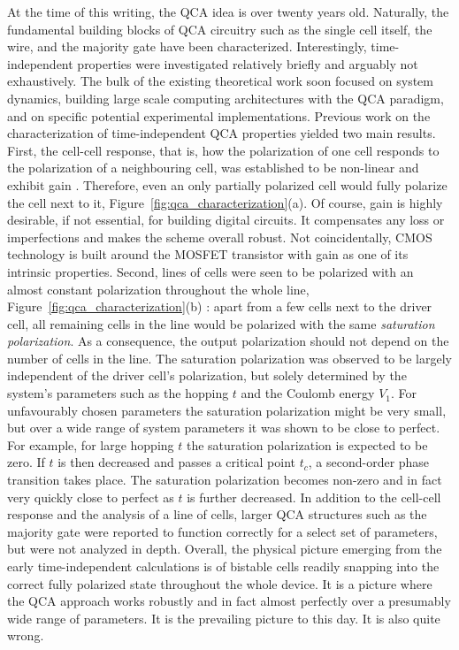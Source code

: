 At the time of this writing, the QCA idea is over twenty years old. Naturally,
the fundamental building blocks of QCA circuitry such as the single cell itself,
the wire, and the majority gate have been characterized. Interestingly,
time-independent properties were investigated relatively briefly and arguably
not exhaustively. The bulk of the existing theoretical work soon focused on
system dynamics, building large scale computing architectures with the QCA
paradigm, and on specific potential experimental implementations. Previous work
on the characterization of time-independent QCA properties yielded two main
results. First, the cell-cell response, that is, how the polarization of one
cell responds to the polarization of a neighbouring cell, was established to be
non-linear and exhibit gain \cite{lent1993quantum}. Therefore, even an only
partially polarized cell would fully polarize the cell next to it,
Figure~\ref{fig:qca_characterization}(a). Of course, gain is highly desirable,
if not essential, for building digital circuits. It compensates any loss or
imperfections and makes the scheme overall robust. Not coincidentally, CMOS
technology is built around the MOSFET transistor with gain as one of its
intrinsic properties. Second, lines of cells were seen to be polarized with an
almost constant polarization throughout the whole line,
Figure~\ref{fig:qca_characterization}(b) \cite{lent1993lines}: apart from a few
cells next to the driver cell, all remaining cells in the line would be
polarized with the same \emph{saturation polarization}. As a consequence, the
output polarization should not depend on the number of cells in the line. The
saturation polarization was observed to be largely independent of the driver
cell's polarization, but solely determined by the system's parameters such as
the hopping $t$ and the Coulomb energy $V_1$. For unfavourably chosen parameters
the saturation polarization might be very small, but over a wide range of system
parameters it was shown to be close to perfect. For example, for large hopping
$t$ the saturation polarization is expected to be zero. If $t$ is then decreased
and passes a critical point $t_c$, a second-order phase transition takes place.
The saturation polarization becomes non-zero and in fact very quickly close to
perfect as $t$ is further decreased. In addition to the cell-cell response and
the analysis of a line of cells, larger QCA structures such as the majority gate
were reported to function correctly for a select set of parameters, but were not
analyzed in depth. Overall, the physical picture emerging from the early
time-independent calculations is of bistable cells readily snapping into the
correct fully polarized state throughout the whole device. It is a picture where
the QCA approach works robustly and in fact almost perfectly over a presumably
wide range of parameters. It is the prevailing picture to this day. It is also
quite wrong.

